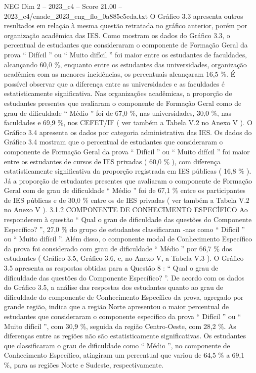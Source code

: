 \begin{textsample}{NEG Dim 2 – 2023\_c4 – Score 21.00 – 2023\_c4/enade\_2023\_eng\_flo\_0a885c5cda.txt}
O Gráfico 3.3 apresenta outros resultados em relação à mesma questão retratada no gráfico anterior, porém por organização acadêmica das IES.
Como mostram os dados do Gráfico 3.3, o percentual de estudantes que consideraram o componente de Formação Geral da prova “ Difícil ” ou “ Muito difícil ” foi maior entre os estudantes de faculdades, alcançando 60,0 \%, enquanto entre os estudantes das universidades, organização acadêmica com as menores incidências, os percentuais alcançaram 16,5 \%.
É possível observar que a diferença entre as universidades e as faculdades é estatisticamente significativa.
Nas organizações acadêmicas, a proporção de estudantes presentes que avaliaram o componente de Formação Geral como de grau de dificuldade “ Médio ” foi de 67,0 \%, nas universidades, 30,0 \%, nas faculdades e 69,9 \%, nos CEFET/IF ( ver também a Tabela V.2 no Anexo V ).
O Gráfico 3.4 apresenta os dados por categoria administrativa das IES.
Os dados do Gráfico 3.4 mostram que o percentual de estudantes que consideraram o componente de Formação Geral da prova “ Difícil ” ou “ Muito difícil ” foi maior entre os estudantes de cursos de IES privadas ( 60,0 \% ), com diferença estatisticamente significativa da proporção registrada em IES públicas ( 16,8 \% ).
Já a proporção de estudantes presentes que avaliaram o componente de Formação Geral com de grau de dificuldade “ Médio ” foi de 67,1 \% entre os participantes de IES públicas e de 30,0 \% entre os de IES privadas ( ver também a Tabela V.2 no Anexo V ). 3.1.2 COMPONENTE DE CONHECIMENTO ESPECÍFICO Ao responderem à questão “ Qual o grau de dificuldade das questões do Componente Específico? ”, 27,0 \% do grupo de estudantes classificaram -nas como “ Difícil ” ou “ Muito difícil ”.
Além disso, o componente modal de Conhecimento Específico da prova foi considerado com grau de dificuldade “ Médio ” por 66,7 \% dos estudantes ( Gráfico 3.5, Gráfico 3.6, e, no Anexo V, a Tabela V.3 ).
O Gráfico 3.5 apresenta as respostas obtidas para a Questão 8 : “ Qual o grau de dificuldade das questões do Componente Específico? ”.
De acordo com os dados do Gráfico 3.5, a análise das respostas dos estudantes quanto ao grau de dificuldade do componente de Conhecimento Específico da prova, agregado por grande região, indica que a região Norte apresentou o maior percentual de estudantes que consideraram o componente específico da prova “ Difícil ” ou “ Muito difícil ”, com 30,9 \%, seguida da região Centro-Oeste, com 28,2 \%.
As diferenças entre as regiões não são estatisticamente significativas.
Os estudantes que classificaram o grau de dificuldade como “ Médio ”, no componente de Conhecimento Específico, atingiram um percentual que variou de 64,5 \% a 69,1 \%, para as regiões Norte e Sudeste, respectivamente.

\end{textsample}
